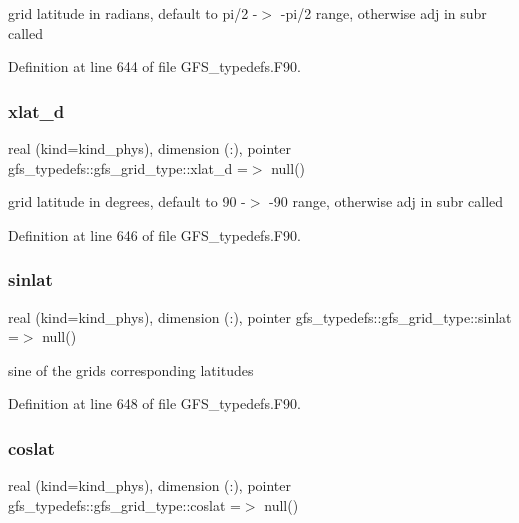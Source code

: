 grid latitude in radians, default to pi/2 -\/$>$ -\/pi/2 range, otherwise adj in subr called 



Definition at line 644 of file G\+F\+S\+\_\+typedefs.\+F90.

\mbox{\label{structgfs__typedefs_1_1gfs__grid__type_a225c7a12dfb1a34c5285fd867fa2b9a2}} 
\subsubsection{xlat\+\_\+d}
{\footnotesize\ttfamily real (kind=kind\+\_\+phys), dimension (\+:), pointer gfs\+\_\+typedefs\+::gfs\+\_\+grid\+\_\+type\+::xlat\+\_\+d =$>$ null()}



grid latitude in degrees, default to 90 -\/$>$ -\/90 range, otherwise adj in subr called 



Definition at line 646 of file G\+F\+S\+\_\+typedefs.\+F90.

\mbox{\label{structgfs__typedefs_1_1gfs__grid__type_adb544a88fbc90b9bd62d34ff3e9ebf30}} 
\subsubsection{sinlat}
{\footnotesize\ttfamily real (kind=kind\+\_\+phys), dimension (\+:), pointer gfs\+\_\+typedefs\+::gfs\+\_\+grid\+\_\+type\+::sinlat =$>$ null()}



sine of the grids corresponding latitudes 



Definition at line 648 of file G\+F\+S\+\_\+typedefs.\+F90.

\mbox{\label{structgfs__typedefs_1_1gfs__grid__type_ac6d24b596028c68dda058dc87d1431b7}} 
\subsubsection{coslat}
{\footnotesize\ttfamily real (kind=kind\+\_\+phys), dimension (\+:), pointer gfs\+\_\+typedefs\+::gfs\+\_\+grid\+\_\+type\+::coslat =$>$ null()}



